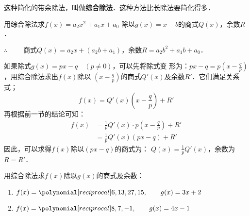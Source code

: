 这种简化的带余除法，叫做\textbf{综合除法}．这种方法比长除法要简化得多．

\begin{example}
    用综合除法求$f(x)=a_2x^2+a_1x+a_0$ 除以$g(x)=x-b$的商式$Q(x)$，余数$R$．
\end{example}

\begin{solution}
    \begin{center}
      \end{center}
$\therefore\qquad $ 商式$Q(x)=a_2x+(a_2b+a_1)$，余数$R=a_2b^2+a_1b+a_0$．
\end{solution}

如果除式$g(x)=px-q\quad (p\ne 0)$，可以先将除式变
形为：$px-q=p\left(x-\frac{q}{p}\right)$，用综合除法求出$f(x)$除以
$\left(x-\frac{q}{p}\right)$的商式$Q'(x)$及余数$R'$．它们满足关系式；
\[f(x)=Q'(x)\left(x-\frac{q}{p}\right)+R' \]
再根据前一节的结论可知：
\[\begin{split}
f(x)&=\frac{1}{p}Q'(x)\cdot p\left(x-\frac{q}{p}\right)+R'\\
&=\frac{1}{p}Q'(x)(px-q)+R'
\end{split}\]
因此，可以求得$f(x)$除以$(px-q)$的商式为：
$Q(x)=\frac{1}{p}Q'(x)$，余数为$R=R'$．

\begin{example}
    用综合除法求$f(x)$除以$g(x)$的商式及余数：
\begin{enumerate}
    \item $f(x)=\poly{6,13,27,15},\qquad g(x)=3x+2$
    \item $f(x)=\poly{8,7,-1},\qquad g(x)=4x-1$
\end{enumerate}    
\end{example}

